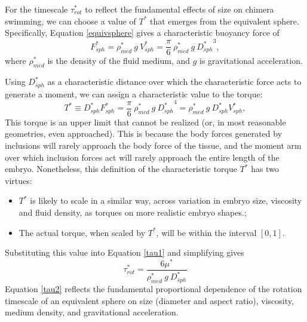 \documentclass[10pt,a4paper]{article}
\begin{document}
For the timescale $\tau^*_{rot}$ to reflect the fundamental effects of size on chimera swimming, we can choose a value of $T^*$ that emerges from the equivalent sphere.
Specifically, Equation \ref{equivsphere} gives a characteristic buoyancy force of
\begin{equation}\label{charF}
	F_{sph}^* = \rho_{med}^* ~ g ~ V_{sph}^* = \frac{\pi}{6} ~ \rho_{med}^* ~ g ~ {D_{sph}^*}^3,
\end{equation} 
where $\rho_{med}^*$ is the density of the fluid medium, and $g$ is gravitational acceleration.

Using $D_{sph}^*$ as a characteristic distance over which the characteristic force acts to generate a moment, we can assign a characteristic value to the torque:
\begin{equation}\label{charT}
	T^* \equiv D_{sph}^* F_{sph}^* = \frac{\pi}{6} ~ \rho_{med}^* ~ g ~ {D_{sph}^*}^4 =  \rho_{med}^* ~ g ~ D_{sph}^* V_{sph}^*,
\end{equation} 
This torque is an upper limit that cannot be realized (or, in most reasonable geometries, even approached).
This is because the body forces generated by inclusions will rarely approach the body force of the tissue, and the moment arm over which inclusion forces act will rarely approach the entire length of the embryo. 
Nonetheless, this definition of the characteristic torque $T^*$ has two virtues:
\begin{itemize}
	\item $T^*$ is likely to scale in a similar way, across variation in embryo size, viscosity and fluid density, as torques on more realistic embryo shapes.;
	\item The actual torque, when scaled by $T^*$, will be within the interval $[0,1]$.
\end{itemize}
Substituting this value into Equation \ref{tau1} and simplifying gives
\begin{equation}\label{tau2}
	\tau^*_{rot} = \frac{6 \mu^*}{\rho^*_{med} ~ g ~ D_{sph}^*}
\end{equation}
Equation \ref{tau2} reflects the fundamental proportional dependence of the rotation timescale of an equivalent sphere on size (diameter and aspect ratio), viscosity, medium density, and gravitational acceleration.
\end{document}
